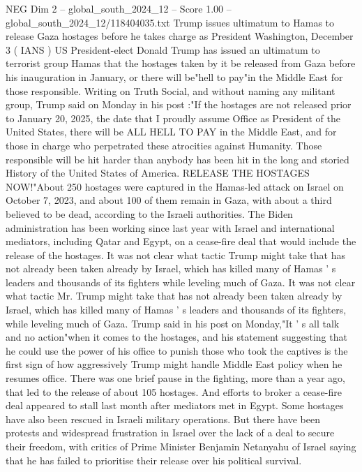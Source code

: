 \begin{textsample}{NEG Dim 2 – global\_south\_2024\_12 – Score 1.00 – global\_south\_2024\_12/118404035.txt}  \label{ex:f2_neg_379}
Trump issues ultimatum to Hamas to release Gaza hostages before he takes charge as President Washington, December 3 ( IANS ) US President-elect Donald Trump has issued an ultimatum to terrorist group Hamas that the hostages taken by it be released from Gaza before his inauguration in January, or there will be"hell to pay"in the Middle East for those responsible.
Writing on Truth Social, and without naming any militant group, Trump said on Monday in his post :"If the hostages are not released prior to January 20, 2025, the date that I proudly assume Office as President of the United States, there will be ALL HELL TO PAY in the Middle East, and for those in charge who perpetrated these atrocities against Humanity.
Those responsible will be hit harder than anybody has been hit in the long and storied History of the United States of America.
RELEASE THE HOSTAGES NOW!"About 250 hostages were captured in the Hamas-led attack on Israel on October 7, 2023, and about 100 of them remain in Gaza, with about a third believed to be dead, according to the Israeli authorities.
The Biden administration has been working since last year with Israel and international mediators, including Qatar and Egypt, on a cease-fire deal that would include the release of the hostages.
It was not clear what tactic Trump might take that has not already been taken already by Israel, which has killed many of Hamas ' s leaders and thousands of its fighters while leveling much of Gaza.
It was not clear what tactic Mr.
Trump might take that has not already been taken already by Israel, which has killed many of Hamas ' s leaders and thousands of its fighters, while leveling much of Gaza.
Trump said in his post on Monday,"It ' s all talk and no action"when it comes to the hostages, and his statement suggesting that he could use the power of his office to punish those who took the captives is the first sign of how aggressively Trump might handle Middle East policy when he resumes office.
There was one brief pause in the fighting, more than a year ago, that led to the release of about 105 hostages.
And efforts to broker a cease-fire deal appeared to stall last month after mediators met in Egypt.
Some hostages have also been rescued in Israeli military operations.
But there have been protests and widespread frustration in Israel over the lack of a deal to secure their freedom, with critics of Prime Minister Benjamin Netanyahu of Israel saying that he has failed to prioritise their release over his political survival.

\end{textsample}
